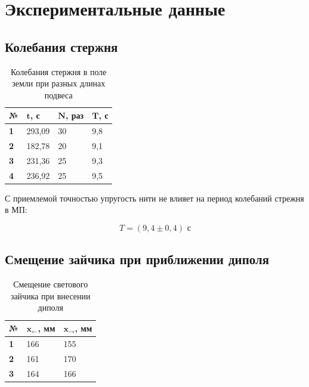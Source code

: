 \documentclass[a4paper, 12pt]{article}
\begin{document}
\section*{Экспериментальные данные}
\subsection*{Колебания стержня}
\begin{table}[H]
\centering


\begin{tabular}{|l|l|l|l|}
\hline
\textbf{№} & \textbf{$\mathbf{t}$, с} & \textbf{$\mathbf{N}$, раз} & \textbf{$\mathbf{T}$, с} \\ \hline
\textbf{1} & 293,09          & 30                & 9,8             \\ \hline
\textbf{2} & 182,78          & 20                & 9,1             \\ \hline
\textbf{3} & 231,36          & 25                & 9,3             \\ \hline
\textbf{4} & 236,92          & 25                & 9,5             \\ \hline
\end{tabular}
\caption{Колебания стержня в поле земли при разных длинах подвеса}


\end{table}

С приемлемой точностью упругость нити не влияет на период колебаний стрежня в МП:

$$T = (9,4\pm0,4) \text{ с}$$


\subsection*{Смещение зайчика при приближении диполя}

\begin{table}[H]
\centering
\begin{tabular}{|l|l|l|}
\hline
\textbf{№}          & \textbf{$\mathbf{x_\leftarrow}$, мм} & \textbf{$\mathbf{x_\rightarrow}$, мм} \\ \hline
\textbf{1} & 166                         & 155                          \\ \hline
\textbf{2} & 161                         & 170                          \\ \hline
\textbf{3} & 164                         & 166                          \\ \hline
\end{tabular}
\caption{Смещение светового зайчика при внесении диполя}

\end{table}
\end{document}
